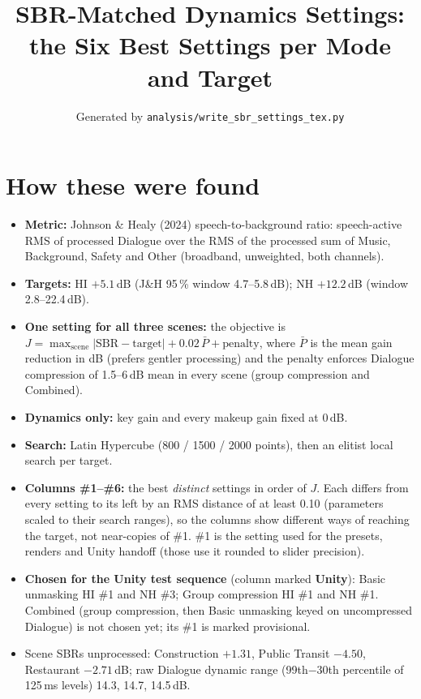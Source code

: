 \documentclass[11pt]{article}
\title{SBR-Matched Dynamics Settings:\\ the Six Best Settings per Mode and Target}
\author{Generated by \texttt{analysis/write\_sbr\_settings\_tex.py}}
\date{}
\begin{document}
\maketitle

\section{How these were found}
\begin{itemize}[nosep]
\item \textbf{Metric:} Johnson \& Healy (2024) speech-to-background ratio: speech-active RMS of processed Dialogue over the
RMS of the processed sum of Music, Background, Safety and Other (broadband, unweighted, both channels).
\item \textbf{Targets:} HI $+5.1$\,dB (J\&H 95\,\% window 4.7--5.8\,dB); NH $+12.2$\,dB (window 2.8--22.4\,dB).
\item \textbf{One setting for all three scenes:} the objective is
$J = \max_{\text{scene}} |\text{SBR} - \text{target}| + 0.02\,\bar{P} + \text{penalty}$, where $\bar{P}$ is the mean gain
reduction in dB (prefers gentler processing) and the penalty enforces Dialogue compression of 1.5--6\,dB mean in every
scene (group compression and Combined).
\item \textbf{Dynamics only:} key gain and every makeup gain fixed at 0\,dB.
\item \textbf{Search:} Latin Hypercube (800 / 1500 / 2000 points), then an elitist local search per target.
\item \textbf{Columns \#1--\#6:} the best \emph{distinct} settings in order of $J$. Each differs from every setting to its
left by an RMS distance of at least 0.10 (parameters scaled to their search ranges), so the columns show different ways
of reaching the target, not near-copies of \#1. \#1 is the setting used for the presets, renders and Unity handoff
(those use it rounded to slider precision).
\item \textbf{Chosen for the Unity test sequence} (column marked \textbf{Unity}): Basic unmasking HI \#1 and NH \#3;
Group compression HI \#1 and NH \#1. Combined (group compression, then Basic unmasking keyed on uncompressed Dialogue)
is not chosen yet; its \#1 is marked provisional.
\item Scene SBRs unprocessed: Construction $+1.31$, Public Transit $-4.50$, Restaurant $-2.71$\,dB; raw Dialogue dynamic
range (99th$-$30th percentile of 125\,ms levels) 14.3, 14.7, 14.5\,dB.
\end{itemize}
\end{document}
